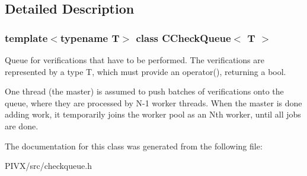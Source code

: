 \subsection{Detailed Description}
\subsubsection*{template$<$typename T$>$\newline
class C\+Check\+Queue$<$ T $>$}

Queue for verifications that have to be performed. The verifications are represented by a type T, which must provide an operator(), returning a bool.

One thread (the master) is assumed to push batches of verifications onto the queue, where they are processed by N-\/1 worker threads. When the master is done adding work, it temporarily joins the worker pool as an N\textquotesingle{}th worker, until all jobs are done. 

The documentation for this class was generated from the following file\+:\begin{DoxyCompactItemize}
\item 
P\+I\+V\+X/src/checkqueue.\+h\end{DoxyCompactItemize}
